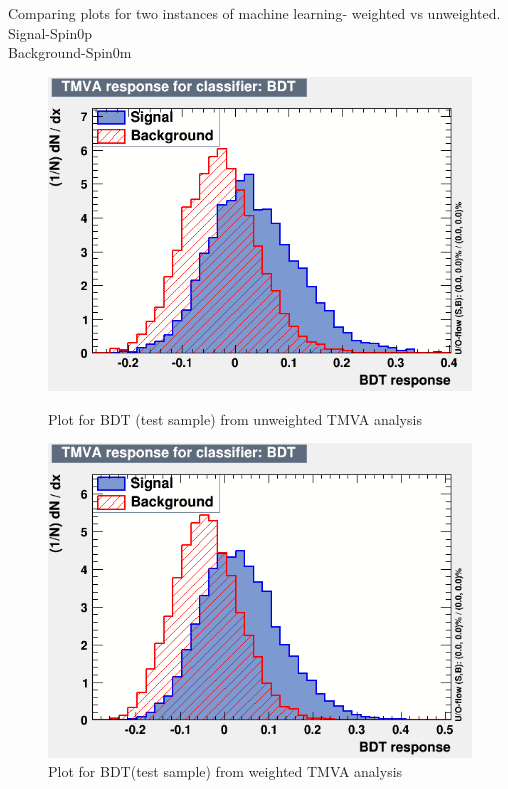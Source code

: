 \documentclass[english]{article}
\begin{document}
Comparing plots for two instances of machine learning- weighted vs unweighted.\\
Signal-Spin0p\\
Background-Spin0m
\begin{figure}[!htb]
	\includegraphics[width=\linewidth]{BDT_t_u}
	\caption{Plot for BDT (test sample) from unweighted TMVA analysis}
\endminipage\hfill
{}
	\includegraphics[width=\linewidth]{BDT_t_w}
	\caption{Plot for BDT(test sample) from weighted TMVA analysis}
\endminipage\hfill
\end{figure}
\end{document}
